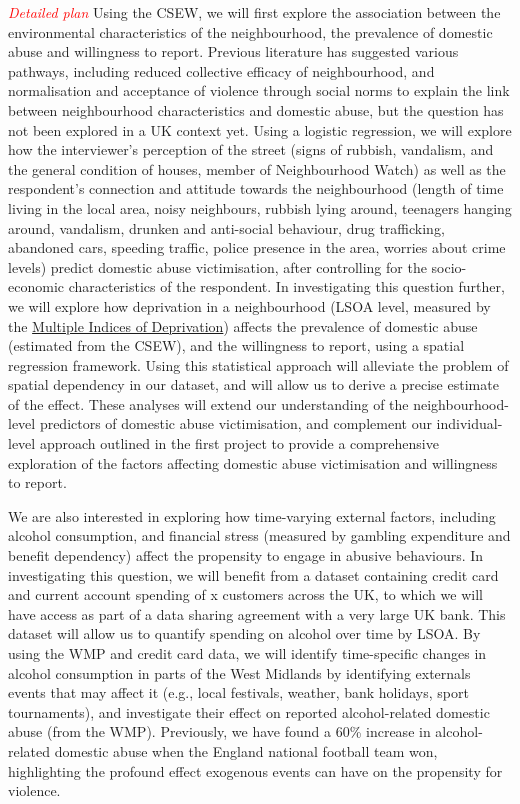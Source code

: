 \documentclass[11pt, a4paper]{article}
\begin{document}
\textcolor{red}{\textit{Detailed plan}} Using the CSEW, we will first explore the association between the environmental characteristics of the neighbourhood, the prevalence of domestic abuse and willingness to report. Previous literature has suggested various pathways, including reduced collective efficacy of neighbourhood, and normalisation and acceptance of violence through social norms to explain the link between neighbourhood characteristics and domestic abuse, but the question has not been explored in a UK context yet. Using a logistic regression, we will explore how the interviewer's perception of the street (signs of rubbish, vandalism, and the general condition of houses, member of Neighbourhood Watch) as well as the respondent's connection and attitude towards the neighbourhood (length of time living in the local area, noisy neighbours, rubbish lying around, teenagers hanging around, vandalism, drunken and anti-social behaviour, drug trafficking, abandoned cars, speeding traffic, police presence in the area, worries about crime levels) predict domestic abuse victimisation, after controlling for the socio-economic characteristics of the respondent. In investigating this question further, we will explore how deprivation in a neighbourhood (LSOA level, measured by the \href{https://data.gov.uk/dataset/8f601edb-6974-417e-9c9d-85832dd2bbf2/english-indices-of-deprivation-2015-lsoa-level}{Multiple Indices of Deprivation}) affects the prevalence of domestic abuse (estimated from the CSEW), and the willingness to report, using a spatial regression framework. Using this statistical approach will alleviate the problem of spatial dependency in our dataset, and will allow us to derive a precise estimate of the effect. These analyses will extend our understanding of the neighbourhood-level predictors of domestic abuse victimisation, and complement our individual-level approach outlined in the first project to provide a comprehensive exploration of the factors affecting domestic abuse victimisation and willingness to report. 
 


We are also interested in exploring how time-varying external factors, including alcohol consumption, and financial stress (measured by gambling expenditure and benefit dependency) affect the propensity to engage in abusive behaviours. In investigating this question, we will benefit from a dataset containing credit card and current account spending of x customers across the UK, to which we will have access as part of a data sharing agreement with a very large UK bank. This dataset will allow us to quantify spending on alcohol over time by LSOA. By using the WMP and credit card data, we will identify time-specific changes in alcohol consumption in parts of the West Midlands by identifying externals events that may affect it (e.g., local festivals, weather, bank holidays, sport tournaments), and investigate their effect on reported alcohol-related domestic abuse (from the WMP). Previously, we have found a 60\% increase in alcohol-related domestic abuse when the England national football team won, highlighting the profound effect exogenous events can have on the propensity for violence. 
\end{document}
